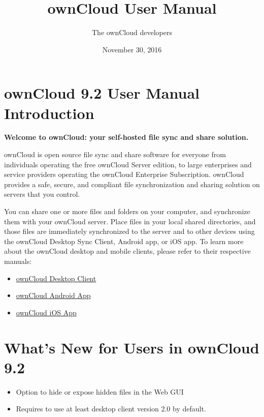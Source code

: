 \documentclass[letterpaper,10pt,english]{sphinxmanual}
\title{ownCloud User Manual}
\date{November 30, 2016}
\author{The ownCloud developers}
\begin{document}
\maketitle
\tableofcontents
{}\label{contents::doc}



\chapter{ownCloud 9.2 User Manual Introduction}
\label{index::doc}\label{index:table-of-contents}\label{index:owncloud-version-user-manual-introduction}\label{index:contents}\label{index:index}
\textbf{Welcome to ownCloud: your self-hosted file sync and share solution.}

ownCloud is open source file sync and share software for everyone from
individuals operating the free ownCloud Server edition, to large enterprises
and service providers operating the ownCloud Enterprise Subscription. ownCloud
provides a safe, secure, and compliant file synchronization and sharing
solution on servers that you control.

You can share one or more files and folders on your computer, and synchronize
them with your ownCloud server. Place files in your local shared directories,
and those files are immediately synchronized to the server and to other devices
using the ownCloud Desktop Sync Client, Android app, or iOS app. To learn more
about the ownCloud desktop and mobile clients, please refer to their respective
manuals:
\begin{itemize}
\item {} 
\href{https://doc.owncloud.org/desktop/2.1/}{ownCloud Desktop Client}

\item {} 
\href{https://doc.owncloud.org/android/}{ownCloud Android App}

\item {} 
\href{https://doc.owncloud.org/ios/}{ownCloud iOS App}

\end{itemize}


\chapter{What's New for Users in ownCloud 9.2}
\label{whats_new:what-s-new-for-users-in-owncloud-version}\label{whats_new::doc}\begin{itemize}
\item {} 
Option to hide or expose hidden files in the Web GUI

\item {} 
Requires to use at least desktop client version 2.0 by default.

\end{itemize}
\end{document}
